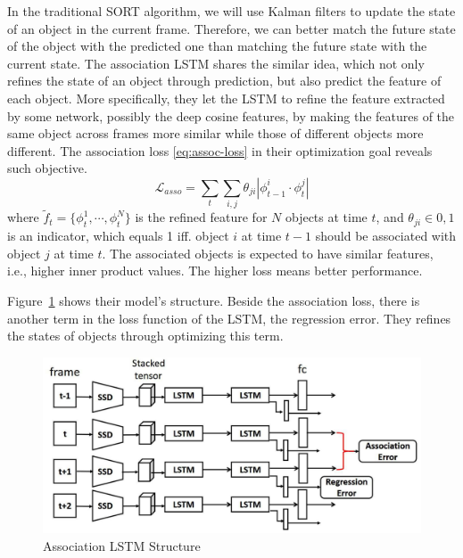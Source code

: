 \documentclass[conference]{IEEEtran}
\begin{document}
In the traditional SORT algorithm, we will use Kalman filters to update the state of an object in the current frame.
Therefore, we can better match the future state of the object with the predicted one than matching the future state with the current state.
The association LSTM shares the similar idea, which not only refines the state of an object through prediction, but also predict the feature of each object.
More specifically, they let the LSTM to refine the feature extracted by some network, possibly the deep cosine features, by making the features of the same object across frames more similar while those of different objects more different.
The association loss \eqref{eq:assoc-loss} in their optimization goal reveals such objective.
\begin{equation}
    \mathcal{L}_{asso} = \sum_t \sum_{i,j} \theta_{ji}|\phi_{t-1}^i \cdot \phi_t^j|
    \label{eq:assoc-loss}
\end{equation}
where $\tilde{f}_t = \{\phi_t^1, \cdots, \phi_t^N\}$ is the refined feature for $N$ objects at time $t$, and $\theta_{ji} \in 0, 1$ is an indicator, which equals 1 iff. object $i$ at time $t-1$ should be associated with object $j$ at time $t$.
The associated objects is expected to have similar features, i.e., higher inner product values.
The higher loss means better performance.

Figure~\ref{fig:lstm-struct} shows their model's structure.
Beside the association loss, there is another term in the loss function of the LSTM, the regression error.
They refines the states of objects through optimizing this term.

\begin{figure}[h]
    \centering
    \includegraphics[width=0.99\linewidth]{fig/assoc_lstm.png}
    \caption{Association LSTM Structure\protect\footnotemark}
    \label{fig:lstm-struct}
\end{figure}
\end{document}
